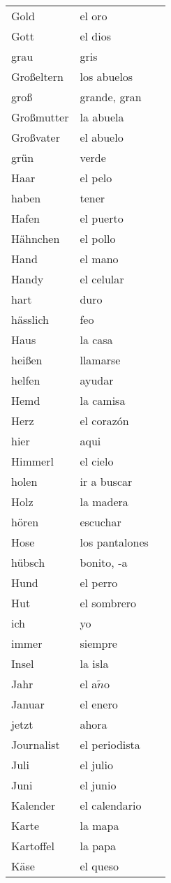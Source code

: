 \documentclass[10pt,spanish]{article}
\begin{document}
\begin{longtable}{p{} p{} | p{}}
Gold & el oro \\
Gott & el dios \\
grau & gris  \\
Großeltern & los abuelos  \\
groß & grande, gran  \\
Großmutter & la abuela  \\
Großvater & el abuelo  \\
grün & verde  \\
Haar & el pelo  \\
haben & tener  \\
Hafen & el puerto  \\
Hähnchen & el pollo  \\
Hand & el mano  \\
Handy & el celular  \\
hart & duro  \\
hässlich & feo \\
Haus & la casa  \\
heißen & llamarse \\
helfen & ayudar  \\
Hemd & la camisa  \\
Herz & el corazón \\
hier & aqui  \\
Himmerl & el cielo  \\
holen & ir a buscar  \\
Holz & la madera  \\
hören & escuchar \\
Hose & los pantalones  \\
hübsch & bonito, -a \\
Hund & el perro  \\
Hut & el sombrero  \\
ich & yo  \\
immer & siempre  \\
Insel & la isla  \\
Jahr & el a$\tilde{n}$o \\
Januar & el enero  \\
jetzt & ahora \\
Journalist & el periodista  \\
Juli & el julio  \\
Juni & el junio  \\
Kalender & el calendario  \\
Karte & la mapa  \\
Kartoffel & la papa  \\
Käse & el queso  \\

\end{longtable}
\end{document}
